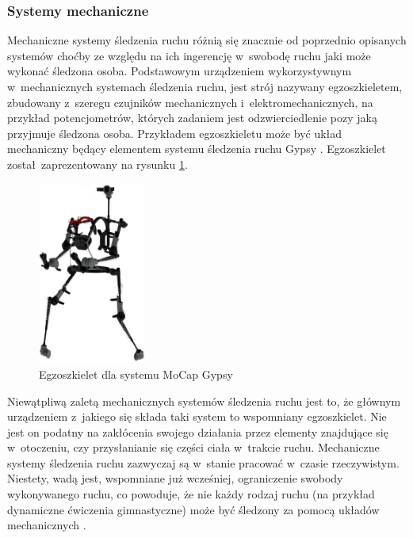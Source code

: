 \subsubsection*{Systemy mechaniczne}
Mechaniczne systemy śledzenia ruchu różnią się znacznie od poprzednio opisanych systemów choćby ze względu na ich ingerencję w~swobodę ruchu jaki może wykonać śledzona osoba. Podstawowym urządzeniem wykorzystywnym w~mechanicznych systemach śledzenia ruchu, jest strój nazywany egzoszkieletem, zbudowany z~szeregu czujników mechanicznych i~elektromechanicznych, na przykład potencjometrów, których zadaniem jest odzwierciedlenie pozy jaką przyjmuje śledzona osoba. Przykładem egzoszkieletu może być układ mechaniczny będący elementem systemu śledzenia ruchu Gypsy . Egzoszkielet został~zaprezentowany na rysunku \ref{fig:literature:footnote:gypsy:full}.
									
\begin{savenotes}
	\begin{figure}[!htb]
		\centering	
		\includegraphics[height=6cm]{images/gypsy7_full.jpg}
		\caption{Egzoszkielet dla systemu MoCap Gypsy}	
		\label{fig:literature:footnote:gypsy:full}
	\end{figure}
\end{savenotes}
											
Niewątpliwą zaletą mechanicznych systemów śledzenia ruchu jest to, że głównym urządzeniem z~jakiego się składa taki system to wspomniany egzoszkielet. Nie jest on podatny na zakłócenia swojego działania przez elementy znajdujące się w~otoczeniu, czy przysłanianie się części ciała w~trakcie ruchu. Mechaniczne systemy śledzenia ruchu zazwyczaj są w~stanie pracować w~czasie rzeczywistym. Niestety, wadą jest, wspomniane już wcześniej, ograniczenie swobody wykonywanego ruchu, co powoduje, że nie każdy rodzaj ruchu (na przykład dynamiczne ćwiczenia gimnastyczne) może być śledzony za pomocą układów mechanicznych .
											
